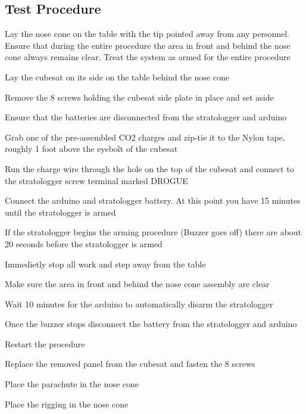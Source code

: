 \subsection{Test Procedure}
\begin{checklist}
    \item \auth{} Lay the nose cone on the table with the tip pointed away from any personnel. Ensure that during the entire procedure the area in front and behind the nose cone always remains clear. Treat the system as armed for the entire procedure
    \item \auth{} Lay the cubesat on its side on the table behind the nose cone
    \item \auth{} Remove the 8 screws holding the cubesat side plate in place and set aside
    \item \auth{} Ensure that the batteries are disconnected from the stratologger and arduino
    \item \auth{} Grab one of the pre-assembled CO2 charges and zip-tie it to the Nylon tape, roughly 1 foot above the eyebolt of the cubesat
    \item \auth{} Run the charge wire through the hole on the top of the cubesat and connect to the stratologger screw terminal marked DROGUE
    \item \auth{} Connect the arduino and stratologger battery. At this point you have 15 minutes until the stratologger is armed
\item \auth{} If the stratologger begins the arming procedure (Buzzer goes off) there are about 20 seconds before the stratologger is armed
\begin{checklist}
    \item {} Immedietly stop all work and step away from the table
    \item {} Make sure the area in front and behind the nose cone assembly are clear
    \item {} Wait 10 minutes for the arduino to automatically disarm the stratologger
    \item {} Once the buzzer stops disconnect the battery from the stratologger and arduino
    \item {} Restart the procedure
\end{checklist}
    \item \auth{} Replace the removed panel from the cubesat and fasten the 8 screws
    \item \auth{} Place the parachute in the nose cone
    \item \auth{} Place the rigging in the nose cone

\end{checklist}
